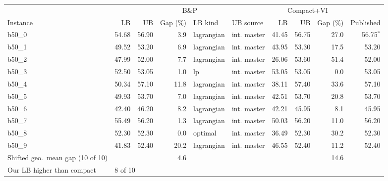 {\small\setlength{\tabcolsep}{3pt}
\begin{tabular}{lrrrllrrrr}
\toprule
 & \multicolumn{5}{c}{B\&P} & \multicolumn{3}{c}{Compact+VI} &  \\
\cmidrule(lr){2-6}\cmidrule(lr){7-9}
Instance & LB & UB & Gap (\%) & LB kind & UB source & LB & UB & Gap (\%) & Published \\
\midrule
b50\_0 & 54.68 & 56.90 & 3.9 & lagrangian & int. master & 41.45 & 56.75 & 27.0 & 56.75$^*$ \\
b50\_1 & 49.52 & 53.20 & 6.9 & lagrangian & int. master & 43.95 & 53.30 & 17.5 & 53.20 \\
b50\_2 & 47.99 & 52.00 & 7.7 & lagrangian & int. master & 26.06 & 53.60 & 51.4 & 52.00 \\
b50\_3 & 52.50 & 53.05 & 1.0 & lp & int. master & 53.05 & 53.05 & 0.0 & 53.05 \\
b50\_4 & 50.34 & 57.10 & 11.8 & lagrangian & int. master & 38.11 & 57.40 & 33.6 & 57.10 \\
b50\_5 & 49.93 & 53.70 & 7.0 & lagrangian & int. master & 42.51 & 53.70 & 20.8 & 53.70 \\
b50\_6 & 42.40 & 46.20 & 8.2 & lagrangian & int. master & 42.21 & 45.95 & 8.1 & 45.95 \\
b50\_7 & 55.49 & 56.20 & 1.3 & lagrangian & int. master & 50.03 & 56.20 & 11.0 & 56.20 \\
b50\_8 & 52.30 & 52.30 & 0.0 & optimal & int. master & 36.49 & 52.30 & 30.2 & 52.30 \\
b50\_9 & 41.83 & 52.40 & 20.2 & lagrangian & int. master & 46.55 & 52.40 & 11.2 & 52.40 \\
\midrule
Shifted geo.\ mean gap (10 of 10) &  &  & 4.6 &  &  &  &  & 14.6 &  \\
Our LB higher than compact & \multicolumn{5}{l}{8 of 10} &  &  &  &  \\
\bottomrule
\end{tabular}}

